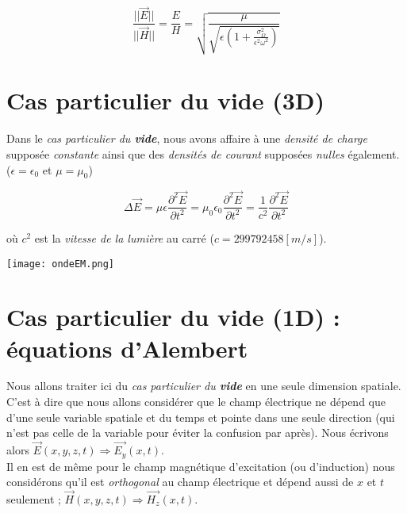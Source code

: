 \[ \frac{|| \vec{E} ||}{|| \vec{H} ||} =  \frac{E}{H} =\sqrt{\frac{\mu}{\sqrt{\epsilon(1+\frac{\sigma_{\Omega}^{2}}{\epsilon^{2} \omega^{2}})}}}\]

\section{Cas particulier du vide (3D)} 

Dans le \textit{cas particulier du \textbf{vide}}, nous avons affaire à une \textit{densité de charge} supposée \textit{constante} ainsi que des \textit{densités de courant} supposées \textit{nulles} également.
($\epsilon = \epsilon_{0}$ et $\mu = \mu_{0}$)

\[ \Delta \vec{E} = \mu \epsilon  \frac{\partial^{2} \vec{E}}{\partial t^{2}} = \mu_{0} \epsilon_{0}  \frac{\partial^{2} \vec{E}}{\partial t^{2}} =\frac{1}{c^{2}} \frac{\partial^{2} \vec{E}}{\partial t^{2}} \]

où $c^{2}$ est la \textit{vitesse de la lumière} au carré ($c = 299 792 458 [m/s]$).

\begin{center}
\texttt{[image: ondeEM.png]}
\end{center}


\section{Cas particulier du vide (1D) : équations d'Alembert}

Nous allons traiter ici du \textit{cas particulier du \textbf{vide}} en une seule dimension spatiale.  \\
C'est à dire que nous allons considérer que le champ électrique ne dépend que d'une seule variable spatiale et du temps et pointe dans une seule direction (qui n'est pas celle de la variable pour éviter la confusion par après).
Nous écrivons alors $\vec{E}(x,y,z,t) \Rightarrow \vec{E_{y}}(x,t)$. \\Il en est de même pour le champ magnétique d'excitation (ou d'induction) nous considérons qu'il est 
\textit{orthogonal} au champ électrique et dépend aussi de $x$ et $t$ seulement ; $\vec{H}(x,y,z,t) \Rightarrow \vec{H_{z}}(x,t)$. \\ 

